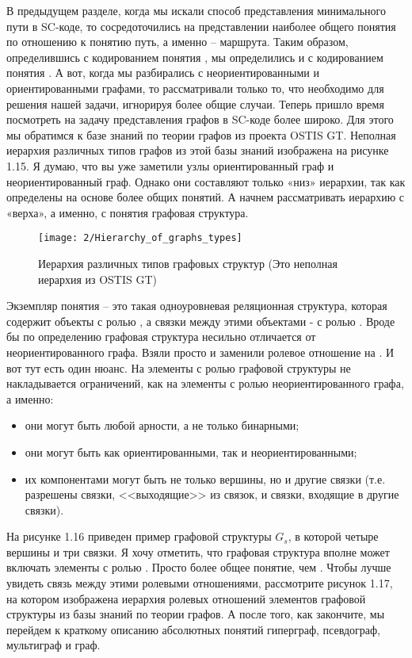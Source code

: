 В предыдущем разделе, когда мы искали способ представления
минимального пути в SC-коде, то сосредоточились на представлении
наиболее общего понятия по отношению к понятию путь, а именно –
маршрута. Таким образом, определившись с кодированием понятия
, мы определились и с кодированием понятия . А
вот, когда мы разбирались с неориентированными и ориентированными
графами, то рассматривали только то, что необходимо для решения нашей
задачи, игнорируя более общие случаи. Теперь пришло время посмотреть
на задачу представления графов в SC-коде более широко. Для этого мы
обратимся к базе знаний по теории графов из проекта OSTIS GT. Неполная
иерархия различных типов графов из этой базы знаний изображена на
рисунке 1.15. Я думаю, что вы уже заметили узлы ориентированный граф и
неориентированный граф. Однако они составляют только «низ» иерархии,
так как определены на основе более общих понятий. А начнем
рассматривать иерархию с «верха», а именно, с понятия графовая
структура.

\begin{figure}[h!]
  \centering
  \texttt{[image: 2/Hierarchy\_of\_graphs\_types]}
  \caption{Иерархия различных типов графовых структур (Это неполная
    иерархия из OSTIS GT)}
  \label{fig:Hierarchy_of_graphs_types}
\end{figure}

Экземпляр понятия  – это такая одноуровневая
реляционная структура, которая содержит объекты с ролью
, а связки между этими объектами - с ролью
. Вроде бы по определению графовая структура несильно
отличается от неориентированного графа. Взяли просто и заменили
ролевое отношение  на . И вот тут есть один
нюанс. На элементы с ролью  графовой структуры не
накладывается ограничений, как на элементы с ролью 
неориентированного графа, а именно:

\begin{itemize}
\item они могут быть любой арности, а не только бинарными;
\item они могут быть как ориентированными, так и неориентированными;
\item их компонентами могут быть не только вершины, но и другие связки
  (т.е. разрешены связки, <<выходящие>> из связок, и связки, входящие
  в другие связки).
\end{itemize}

На рисунке 1.16 приведен пример графовой структуры $G_s$, в которой
четыре вершины и три связки. Я хочу отметить, что графовая структура
вполне может включать элементы с ролью . Просто
 более общее понятие, чем . Чтобы лучше
увидеть связь между этими ролевыми отношениями, рассмотрите рисунок
1.17, на котором изображена иерархия ролевых отношений элементов
графовой структуры из базы знаний по теории графов. А после того, как
закончите, мы перейдем к краткому описанию абсолютных понятий
гиперграф, псевдограф, мультиграф и граф.
 
